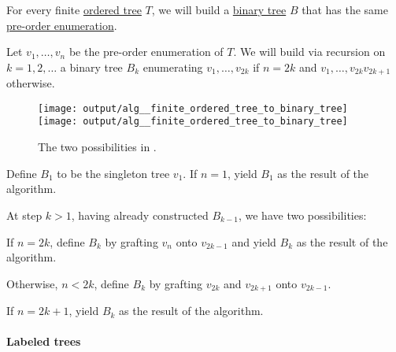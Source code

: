 \begin{algorithm}\label{alg:finite_ordered_tree_to_binary_tree}
  For every finite \hyperref[def:ordered_tree]{ordered tree} \( T \), we will build a \hyperref[def:n_ary_tree]{binary tree} \( B \) that has the same \hyperref[eq:def:ordered_tree_enumeration/pre]{pre-order enumeration}.

  Let \( v_1, \ldots, v_n \) be the pre-order enumeration of \( T \). We will build via recursion on \( k = 1, 2, \ldots \) a binary tree \( B_k \) enumerating \( v_1, \ldots, v_{2k} \) if \( n = 2k \) and \( v_1, \ldots, v_{2k} v_{2k+1} \) otherwise.

  \begin{figure}[!ht]
    \hfill
    \texttt{[image: output/alg\_\_finite\_ordered\_tree\_to\_binary\_tree]}
    \hfill
    \texttt{[image: output/alg\_\_finite\_ordered\_tree\_to\_binary\_tree]}
    \hfill
    \hfill
    \caption{The two possibilities in .}
    \label{fig:alg:finite_ordered_tree_to_binary_tree}
  \end{figure}

  \begin{thmenum}
     Define \( B_1 \) to be the singleton tree \( v_1 \). If \( n = 1 \), yield \( B_1 \) as the result of the algorithm.

     At step \( k > 1 \), having already constructed \( B_{k-1} \), we have two possibilities:
    \begin{thmenum}
       If \( n = 2k \), define \( B_k \) by grafting \( v_n \) onto \( v_{2k-1} \) and yield \( B_k \) as the result of the algorithm.

       Otherwise, \( n < 2k \), define \( B_k \) by grafting \( v_{2k} \) and \( v_{2k+1} \) onto \( v_{2k-1} \).

      If \( n = 2k+1 \), yield \( B_k \) as the result of the algorithm.
    \end{thmenum}
  \end{thmenum}
\end{algorithm}

\paragraph{Labeled trees}

